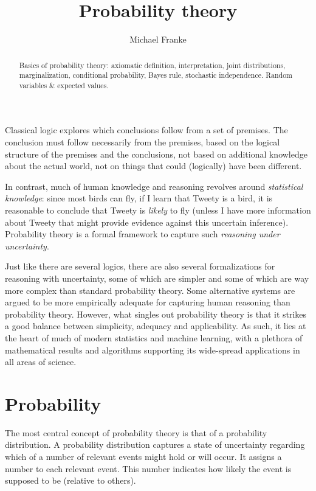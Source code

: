 \documentclass[nobib,nofonts]{tufte-handout}
\title{Probability theory}
\author[M.~Franke]{Michael Franke}
\date{} %
\begin{document}
\maketitle

\begin{abstract}
\noindent
Basics of probability theory:
axiomatic definition,
interpretation,
joint distributions,
marginalization,
conditional probability,
Bayes rule,
stochastic independence.
Random variables \& expected values.
\end{abstract}


\noindent Classical logic explores which conclusions follow from a set of premises.
The conclusion must follow necessarily from the premises, based on the logical structure of the premises and the conclusions, not based on additional knowledge about the actual world, not on things that could (logically) have been different.

In contrast, much of human knowledge and reasoning revolves around \emph{statistical knowledge}: since most birds can fly, if I learn that Tweety is a bird, it is reasonable to conclude that Tweety is \emph{likely} to fly (unless I have more information about Tweety that might provide evidence against this uncertain inference).
Probability theory is a formal framework to capture such \emph{reasoning under uncertainty}.

Just like there are several logics, there are also several formalizations for reasoning with uncertainty, some of which are simpler and some of which are way more complex than standard probability theory.
Some alternative systems are argued to be more empirically adequate for capturing human reasoning than probability theory.
However, what singles out probability theory is that it strikes a good balance between simplicity, adequacy and applicability.
As such, it lies at the heart of much of modern statistics and machine learning, with a plethora of mathematical results and algorithms supporting its wide-spread applications in all areas of science.

\section{Probability}

The most central concept of probability theory is that of a probability distribution.
A probability distribution captures a state of uncertainty regarding which of a number of relevant events might hold or will occur.
It assigns a number to each relevant event.
This number indicates how likely the event is supposed to be (relative to others).
\end{document}
